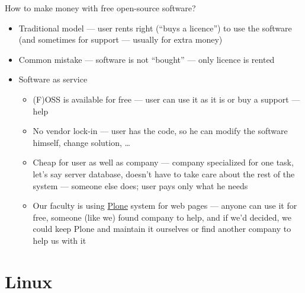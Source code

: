\documentclass[hyperref={bookmarks=true, unicode=true, colorlinks=true, pdftitle={Linux, command line and MetaCentrum}, plainpages=false, pdfauthor={Vojtech Zeisek}, pdfsubject={Course about use of Linux command line, writing shell scripts and using MetaCentrum of CESNET}, pdfcreator={XeLaTeX, http://www.xelatex.org/}, pdfkeywords={Linux, GNU, BASH, shell, command line, MetaCentrum}, linkcolor=Sienna, anchorcolor=black, citecolor=green, filecolor=magenta, menucolor=Sienna, urlcolor=cyan, pdftex}, compress, ucs, xelatex, xcolor=svgnames, 11pt]{beamer}
\begin{document}
\begin{frame}{How to make money with free open-source software?}
\begin{itemize}
  \item Traditional model --- user rents right (``buys a licence'') to use the software (and sometimes for support --- usually for extra money)
  \item Common mistake --- software is not ``bought'' --- only licence is rented
  \item Software as service
  \begin{itemize}
    \item (F)OSS is available for free --- user can use it as it is or buy a support --- help
    \item No vendor lock-in --- user has the code, so he can modify the software himself, change solution, \ldots
    \item Cheap for user as well as company --- company specialized for one task, let's say server database, doesn't have to take care about the rest of the system --- someone else does; user pays only what he needs
    \item Our faculty is using \href{http://plone.org/}{Plone} system for web pages --- anyone can use it for free, someone (like we) found company to help, and if we'd decided, we  could keep Plone and maintain it ourselves or find another company to help us with it
  \end{itemize}
\end{itemize}
\end{frame}

\section{Linux}
\end{document}
